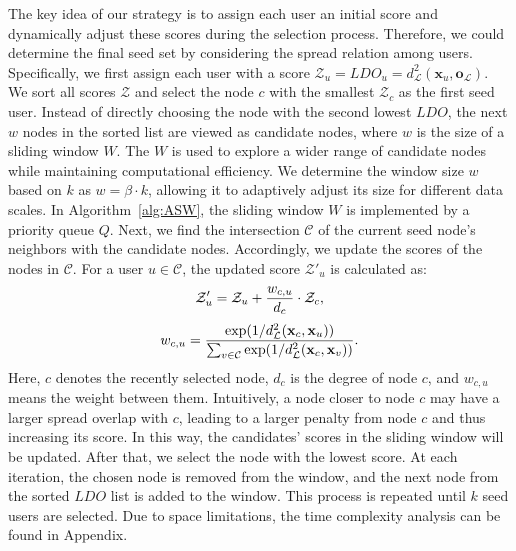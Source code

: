 The key idea of our strategy is to assign each user an initial score and dynamically adjust these scores during the selection process. Therefore, we could determine the final seed set by considering the spread relation among users. Specifically, we first assign each user with a score $\mathcal{Z}_u = LDO_u = d^2_{\mathcal{L}}(\mathbf{x}_u, \mathbf{o}_{\mathcal{L}})$. We sort all scores $\mathcal{Z}$ and select the node $c$ with the smallest $\mathcal{Z}_c$ as the first seed user. Instead of directly choosing the node with the second lowest $LDO$, the next $w$ nodes in the sorted list are viewed as candidate nodes, where $w$ is the size of a sliding window $W$. The $W$ is used to explore a wider range of candidate nodes while maintaining computational efficiency. We determine the window size $w$ based on $k$ as $w = \beta \cdot k$, allowing it to adaptively adjust its size for different data scales.
In Algorithm~\ref{alg:ASW}, the sliding window $W$ is implemented by a priority queue $Q$.
Next, we find the intersection $\mathcal{C}$ of the current seed node's neighbors with the candidate nodes.
Accordingly, we update the scores of the nodes in $\mathcal{C}$. 
For a user $u \in \mathcal{C}$, the updated score $\mathcal{Z}'_u$ is calculated as:
\begin{equation}
\small
\mathcal{Z}'_u = \mathcal{Z}_u + \frac{w_{c,u}}{d_c} \cdot  \mathcal{Z}_{c},
\label{eq:update_score}
\end{equation}
\begin{equation}
\small
w_{c,u} = \frac{
\exp(1/d^2_{\mathcal{L}}(\mathbf{x}_c, \mathbf{x}_u))
}{ \sum_{v \in \mathcal{C}} \exp(1/d^2_{\mathcal{L}}(\mathbf{x}_c, \mathbf{x}_v))}.
\label{eq:update_score_2}
\end{equation}
Here, $c$ denotes the recently selected node, $d_c$ is the degree of node $c$, and $w_{c,u}$ means the weight between them. Intuitively, a node closer to node $c$ may have a larger spread overlap with $c$, leading to a larger penalty from node $c$ and thus increasing its score.
In this way, the candidates' scores in the sliding window will be updated. After that, we select the node with the lowest score. At each iteration, the chosen node is removed from the window, and the next node from the sorted $LDO$ list is added to the window. This process is repeated until $k$ seed users are selected. 
Due to space limitations, the time complexity analysis can be found in Appendix.


